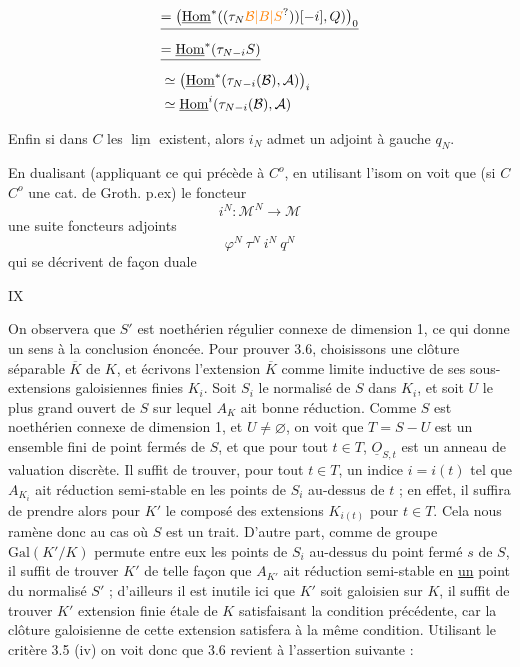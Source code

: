 \[
\begin{aligned}
&\deleted{=\bigl(\underline{\mathrm{Hom}}^{*}((\tau_N\unsure{\mathcal{B}|B|S}))[-i],Q)\bigr)_0}\\
&\deleted{=\underline{\mathrm{Hom}}^{*}(\tau_{N-i}S)}\\
&\simeq\bigl(\underline{\mathrm{Hom}}^{*}(\tau_{N-i}(\mathcal{B}),\mathcal{A})\bigr)_i\\
&\simeq\underline{\mathrm{Hom}}^{i}(\tau_{N-i}(\mathcal{B}),\mathcal{A})
\end{aligned}
\]

Enfin si dans $C$ les $\underline{\lim}$ existent, alors $i_N$ admet un adjoint à gauche $q_N$.

En dualisant (appliquant ce qui précède à $C^o$, en utilisant l'isom
on voit que (si $C$  $C^o$  une cat. de Groth. p.ex) le foncteur
\[
i^N:\mathcal{M}^N\longrightarrow\mathcal{M}
\]
  une suite   foncteurs adjoints
\[
\varphi^{N}\ \tau^{N}\ i^{N}\ q^{N}
\]
qui se décrivent de façon duale 

\hfill IX

On observera que $S'$ est noethérien régulier connexe de dimension 1, ce qui donne un sens à la conclusion énoncée. Pour prouver 3.6, choisissons une clôture séparable $\overline{K}$ de $K$, et écrivons l'extension $\overline{K}$ comme limite inductive de ses sous-extensions galoisiennes finies $K_i$. Soit $S_i$ le normalisé de $S$ dans $K_i$, et soit $U$ le plus grand ouvert de $S$ sur lequel $A_K$ ait bonne réduction. Comme $S$ est noethérien connexe de dimension 1, et $U\ne\varnothing$, on voit que $T=S-U$ est un ensemble fini de point fermés de $S$, et que pour tout $t\in T$, $\underline{O}_{S,t}$ est un anneau de valuation discrète. Il suffit de trouver, pour tout $t\in T$, un indice $i=i(t)$ tel que $A_{K_i}$ ait réduction semi-stable en les points de $S_i$ au-dessus de $t$ ; en effet, il suffira de prendre alors pour $K'$ le composé des extensions $K_{i(t)}$ pour $t\in T$. Cela nous ramène donc au cas où $S$ est un trait. D'autre part, comme de groupe $\mathrm{Gal}(K'/K)$ permute entre eux les points de $S_i$ au-dessus du point fermé $s$ de $S$, il suffit de trouver $K'$ de telle façon que $A_{K'}$ ait réduction semi-stable en \uline{un} point du normalisé $S'$ ; d'ailleurs il est inutile ici que $K'$ soit galoisien sur $K$, il suffit de trouver $K'$ extension finie étale de $K$ satisfaisant la condition précédente, car la clôture galoisienne de cette extension satisfera à la même condition. Utilisant le critère 3.5 (iv) on voit donc que 3.6 revient à l'assertion suivante :

